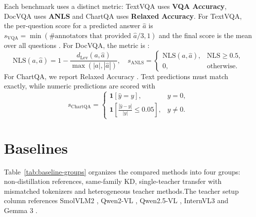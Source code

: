 \begin{table}[H]
\centering
\caption[Dataset split sizes.]{Dataset split sizes.}
\label{tab:dataset-sizes}
\end{table}

Each benchmark uses a distinct metric: TextVQA uses \textbf{VQA Accuracy},
DocVQA uses \textbf{ANLS} and ChartQA uses \textbf{Relaxed Accuracy}. For TextVQA, the per-question
score for a predicted answer \(\hat{a}\) is
\(s_{\text{VQA}}=\min(\#\text{annotators that provided }\hat{a}/3,1)\) and
the final score is the mean over all questions \cite{singh2019vqamodelsread}.
For DocVQA, the metric is \cite{mathew2021docvqadatasetvqadocument}:
\[
\mathrm{NLS}(a,\hat{a})=1-\frac{d_{\text{Lev}}(a,\hat{a})}{\max(|a|,|\hat{a}|)}, \quad
s_{\text{ANLS}}=
\begin{cases}
\mathrm{NLS}(a,\hat{a}), & \mathrm{NLS}\ge 0.5,\\
0, & \text{otherwise}.
\end{cases}
\]
For ChartQA, we report Relaxed Accuracy
\cite{masry2022chartqabenchmarkquestionanswering}. Text predictions must match
exactly, while numeric predictions are scored with
\[
s_{\mathrm{ChartQA}}=
\begin{cases}
\mathbf{1}[\hat{y}=y], & y=0,\\
\mathbf{1}\!\left[\frac{|\hat{y}-y|}{|y|}\le 0.05\right], & y\ne0.
\end{cases}
\]

\section{Baselines}
\label{sec:baselines}

Table~\ref{tab:baseline-groups} organizes the compared methods into four
groups: non-distillation references, same-family KD, single-teacher transfer with mismatched tokenizers and heterogeneous teacher methods.The teacher setup column references SmolVLM2
\cite{smolvlm2_modelcard,marafioti2025smolvlm}, Qwen2-VL
\cite{qwen2vl2b_modelcard,wang2024qwen2vl}, Qwen2.5-VL
\cite{qwen25vl3b_modelcard,bai2025qwen25vl}, InternVL3
\cite{internvl3_blog,internvl3_1b_modelcard} and Gemma 3
\cite{gemma3_technical_report}.


